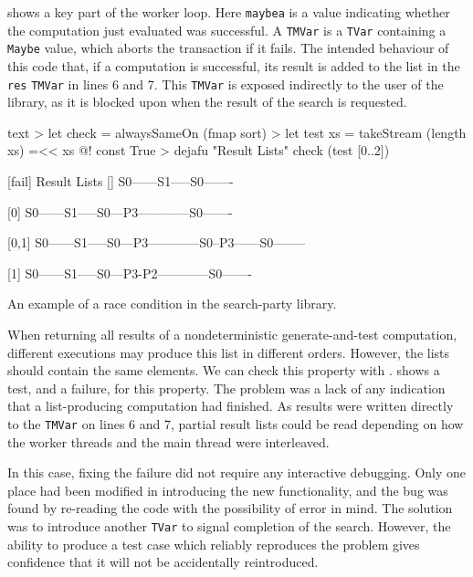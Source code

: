  shows a key part of the worker loop.
Here \verb|maybea| is a value indicating whether the computation just
evaluated was successful.  A \verb|TMVar| is a \verb|TVar| containing
a \verb|Maybe| value, which aborts the transaction if it fails.  The
intended behaviour of this code that, if a computation is successful,
its result is added to the list in the \verb|res| \verb|TMVar| in
lines 6 and 7.  This \verb|TMVar| is exposed indirectly to the user of
the library, as it is blocked upon when the result of the search is
requested.

\begin{listing}
\centering
\begin{cminted}{text}
> let check = alwaysSameOn (fmap sort)
> let test xs = takeStream (length xs) =<< xs @! const True
> dejafu "Result Lists" check (test [0..2])

[fail] Result Lists
        [] S0------S1-----S0-------

        [0] S0------S1-----S0---P3------------S0-------

        [0,1] S0------S1-----S0---P3------------S0--P3------S0--------

        [1] S0------S1-----S0---P3-P2------------S0-------
\end{cminted}
\caption{An example of a race condition in the search-party library.}\label{lst:example-searchparty2}
\end{listing}

When returning all results of a nondeterministic generate-and-test
computation, different executions may produce this list in different
orders.  However, the lists should contain the same elements.  We can
check this property with \dejafu{}.  
shows a test, and a failure, for this property.  The problem was a
lack of any indication that a list-producing computation had finished.
As results were written directly to the \verb|TMVar| on lines 6 and 7,
partial result lists could be read depending on how the worker threads
and the main thread were interleaved.

In this case, fixing the failure did not require any interactive
debugging.  Only one place had been modified in introducing the new
functionality, and the bug was found by re-reading the code with the
possibility of error in mind.  The solution was to introduce another
\verb|TVar| to signal completion of the search.  However, the ability
to produce a test case which reliably reproduces the problem gives
confidence that it will not be accidentally reintroduced.

